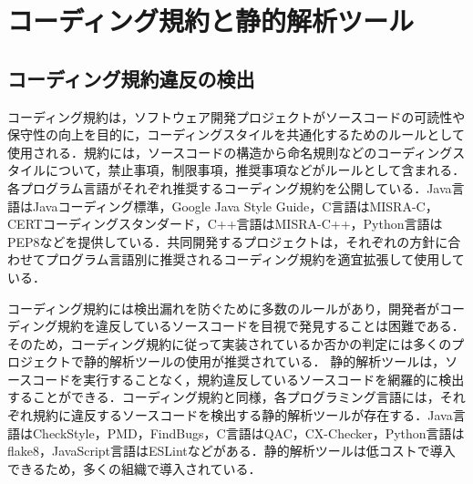 \documentclass[T,J]{fose} %
\begin{document}

\section{コーディング規約と静的解析ツール}\label{sec:background}
\subsection{コーディング規約違反の検出}

コーディング規約は，ソフトウェア開発プロジェクトがソースコードの可読性や保守性の向上を目的に，コーディングスタイルを共通化するためのルールとして使用される．規約には，ソースコードの構造から命名規則などのコーディングスタイルについて，禁止事項，制限事項，推奨事項などがルールとして含まれる．各プログラム言語がそれぞれ推奨するコーディング規約を公開している．Java言語はJavaコーディング標準，Google Java Style Guide，C言語はMISRA-C，CERTコーディングスタンダード，C++言語はMISRA-C++，Python言語はPEP8などを提供している．共同開発するプロジェクトは，それぞれの方針に合わせてプログラム言語別に推奨されるコーディング規約を適宜拡張して使用している．


コーディング規約には検出漏れを防ぐために多数のルールがあり，開発者がコーディング規約を違反しているソースコードを目視で発見することは困難である．そのため，コーディング規約に従って実装されているか否かの判定には多くのプロジェクトで静的解析ツールの使用が推奨されている\cite{Beller}．
静的解析ツールは，ソースコードを実行することなく，規約違反しているソースコードを網羅的に検出することができる．コーディング規約と同様，各プログラミング言語には，それぞれ規約に違反するソースコードを検出する静的解析ツールが存在する．Java言語はCheckStyle，PMD，FindBugs，C言語はQAC，CX-Checker，Python言語はflake8，JavaScript言語はESLintなどがある．静的解析ツールは低コストで導入できるため，多くの組織で導入されている\cite{UsingStaticAnalysisTools1}\cite{UsingStaticAnalysisTools2}．
\end{document}
